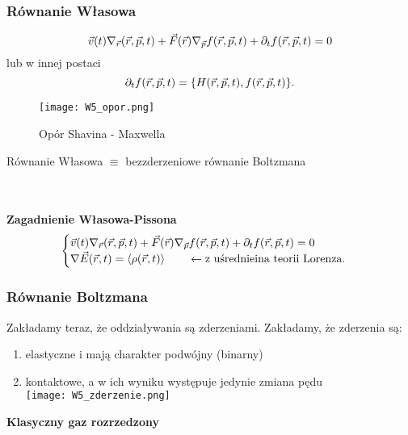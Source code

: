 \subsubsection{Równanie Własowa}
\begin{equation}
\vec{v}(t) \nabla_{\vec{r}} (\vec{r},\vec{p},t) + \vec{F}(\vec{r}) \nabla_{\vec{p}}f(\vec{r},\vec{p},t) +\partial_t f(\vec{r},\vec{p},t) =0
\end{equation}
lub w innej postaci
\begin{equation}
\partial_t f(\vec{r},\vec{p},t) = \{ H(\vec{r},\vec{p},t),f(\vec{r},\vec{p},t)\}.
\end{equation}
\begin{figure}[h!]
\centering
\caption[]{Opór Shavina - Maxwella}
\texttt{[image: W5\_opor.png]}
\end{figure}
\begin{center}
Równanie Własowa $\equiv$ bezzderzeniowe równanie Boltzmana
\end{center}
$ $
\\
\\
\\
\textbf{Zagadnienie Własowa-Pissona}
$$\begin{cases}
\vec{v}(t) \nabla_{\vec{r}} (\vec{r},\vec{p},t) + \vec{F}(\vec{r}) \nabla_{\vec{p}}f(\vec{r},\vec{p},t) +\partial_t f(\vec{r},\vec{p},t) =0&\\
\nabla \vec{E} (\vec{r},t) = \left< \rho (\vec{r},t) \right>  \qquad \leftarrow \mbox{z uśrednieina teorii Lorenza}.& 
\end{cases}$$
\subsubsection{Równanie Boltzmana}
Zakładamy teraz, że oddziaływania są zderzeniami. Zakładamy, że zderzenia są:
\begin{enumerate}
\item elastyczne i mają charakter podwójny (binarny)
\item kontaktowe, a w ich wyniku występuje jedynie zmiana pędu\\
\texttt{[image: W5\_zderzenie.png]}
\end{enumerate}
\textbf{Klasyczny gaz rozrzedzony}

